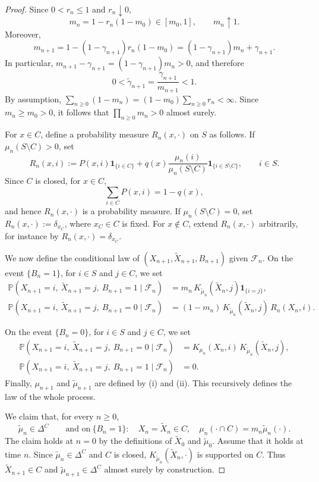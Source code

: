 \documentclass[10pt,letterpaper]{article}
\theoremstyle{compactplain}
\theoremstyle{compactdefinition}
\newcommand{\1}{\mathds{1}}
\begin{document}
\begin{proof}
Since \(0<r_n\leq1\) and \(r_n\downarrow0\),
\[
m_n=1-r_n(1-m_0)\in[m_0,1],
\qquad
m_n\uparrow1.
\]
Moreover,
\[
m_{n+1}
=
1-(1-\gamma_{n+1})r_n(1-m_0)
=
(1-\gamma_{n+1})m_n+\gamma_{n+1}.
\]
In particular, \(m_{n+1}-\gamma_{n+1}
=
(1-\gamma_{n+1})m_n >0\),
and therefore
\[
0<
\widetilde\gamma_{n+1}
=
\frac{\gamma_{n+1}}{m_{n+1}}
<1.
\]
By assumption,
\(\sum_{n\geq0}(1-m_n)=(1-m_0)\sum_{n\geq0}r_n<\infty\).
Since \(m_n\geq m_0>0\), it follows that
\(\prod_{n\geq0}m_n>0\) almost surely.

For \(x\in C\), define a probability measure \(R_n(x,\cdot)\) on \(S\) as
follows. If \(\mu_n(S\setminus C)>0\), set
\[
R_n(x,i):=
P(x,i)\mathbf 1_{ \{i\in C\} }
+
q(x)\frac{\mu_n(i)}{\mu_n(S\setminus C)}\mathbf 1_{ \{i\in S\setminus C\}},
\qquad i\in S.
\]
Since \(C\) is closed, for \(x\in C\),
\[
\sum_{i\in C}P(x,i)=1-q(x),
\]
and hence \(R_n(x,\cdot)\) is a probability measure. If \(\mu_n(S\setminus C)=0\), set
\(R_n(x,\cdot):=\delta_{x_C}\), where \(x_C\in C\) is fixed. For \(x\notin C\), extend \(R_n(x,\cdot)\) arbitrarily, for instance by \(R_n(x,\cdot)=\delta_{x_C}\).


\medskip
We now define the conditional law of \((X_{n+1},\widetilde X_{n+1},B_{n+1})\) given \(\mathcal F_n\).  On the event \(\{B_n=1\}\), for \(i\in S\) and \(j\in C\), we set
\begin{align}
\mathbb P(X_{n+1}=i, \ \widetilde X_{n+1}=j,\ B_{n+1}=1 \mid  \mathcal F_n)&=
m_n\,K_{\widetilde\mu_n}(\widetilde X_n,j)\mathbf 1_{ \{i=j\} },\label{eq:coupling-B1-one}\\
\mathbb P(X_{n+1}=i,\ \widetilde X_{n+1}=j,\ B_{n+1}=0\mid\mathcal F_n)
&=
(1-m_n)\,K_{\widetilde{\mu}_n}(\widetilde X_n,j)\,R_n(X_n,i).\label{eq:coupling-B1-zero}
\end{align}

On the event \(\{B_n=0\}\), for \(i\in S\) and \(j\in C\), we set
\begin{align}
\mathbb P(X_{n+1}=i,\ \widetilde X_{n+1}=j,\ B_{n+1}=0\mid\mathcal F_n)
&=
K_{\mu_n}(X_n,i)\,K_{\widetilde\mu_n}(\widetilde X_n,j),\label{eq:coupling-B0-zero}\\
\mathbb P(X_{n+1}=i,\ \widetilde X_{n+1}=j,\ B_{n+1}=1\mid\mathcal F_n)
&=0.\label{eq:coupling-B0-one}
\end{align}
Finally, \(\mu_{n+1}\) and \(\widetilde\mu_{n+1}\) are defined by (i) and (ii). This recursively defines the law of the whole process.

We claim that, for every \(n\geq 0\),
\begin{equation}
\label{eq:coupling-claim}
\widetilde\mu_n\in\Delta^C
\qquad
\text{and on} \ \{B_n=1\}: \quad
X_n=\widetilde X_n\in C,
\quad
\mu_n(\cdot\cap C)=m_n\widetilde\mu_n(\cdot).
\end{equation}
The claim holds at \(n=0\) by the definitions of
\(\widetilde X_0\) and \(\widetilde\mu_0\). Assume that it holds at time
\(n\). Since \(\widetilde\mu_n\in\Delta^C\) and \(C\) is closed, \(K_{\widetilde\mu_n}(\widetilde X_n,\cdot)\) is supported on \(C\). Thus \(\widetilde X_{n+1}\in C\) and 
\(\widetilde\mu_{n+1}\in\Delta^C\) almost surely by construction.


\end{proof}
\end{document}
